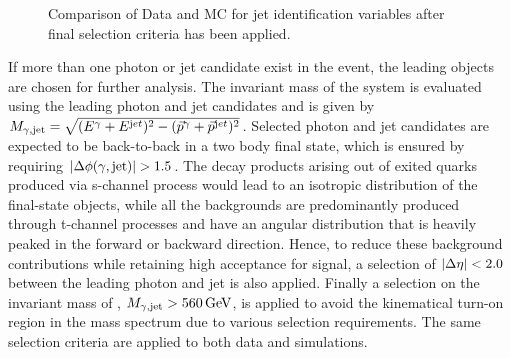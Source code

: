\begin{figure}[h!]
 \caption{Comparison of Data and MC for jet identification variables after final selection criteria has been applied.}
 \label{fig:JetID}
\end{figure}

If more than one photon or jet candidate exist in the event, the leading objects are chosen for further analysis. The invariant mass
of the \gamjet system is evaluated using the leading photon and jet candidates and is given by 
$M_{\gamma, \mathrm{jet}}=\sqrt{(E^{\gamma} + E^{{\mathrm jet}})^{2} - (\vec{p}^{\gamma} + \vec{p}^{{\mathrm jet}})^{2}}$.
Selected photon and jet candidates are expected to be back-to-back in a two body final state, which is ensured by requiring 
$\lvert \Delta\phi(\gamma,\mathrm{jet}) \rvert>1.5$. The decay products arising out of exited quarks produced via s-channel process would lead to an isotropic distribution of 
the final-state objects, while all the backgrounds are predominantly produced through t-channel processes and have an angular distribution that is
heavily peaked in the forward or backward direction. Hence, to reduce these background contributions while retaining high acceptance for signal,
a selection of $\lvert \Delta\eta \rvert<2.0$ between the leading photon and jet is also applied. %
Finally a selection on the invariant mass of \gamjet, \ie $M_{\gamma, \mathrm{jet}}>560\mathrm{\,GeV}$, is applied to avoid the kinematical turn-on region in 
the \gamjet mass spectrum due to various selection requirements. The same selection criteria are applied to both data and simulations. 

